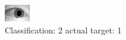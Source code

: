 \begin{figure}[h!]
\begin{center}
\includegraphics[width=0.60\columnwidth]{figures/ID1434_class_2_target_1.png}
\end{center}
\caption{ Classification: 2 actual target: 1}
\label{fig:ID1434_class_2_target_1}
\end{figure}
